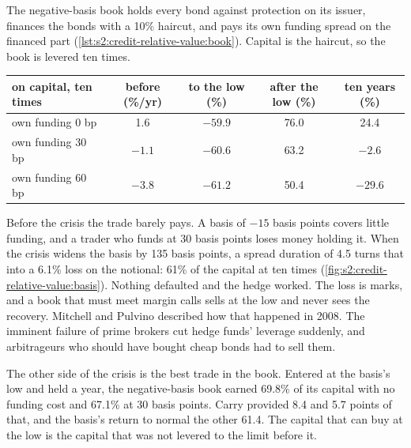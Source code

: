 The negative-basis book holds every bond against protection on its issuer, finances the bonds with a 10\% haircut, and pays its own funding spread on
the financed part (\cref{lst:s2:credit-relative-value:book}). Capital is the haircut, so the book is levered ten times.

\begin{center}
\small
\begin{tabular}{@{}lcccc@{}}
\toprule
on capital, ten times & before (\%/yr) & to the low (\%) & after the low (\%) & ten years (\%)\\
\midrule
own funding 0 bp & 1.6 & $-59.9$ & 76.0 & 24.4\\
own funding 30 bp & $-1.1$ & $-60.6$ & 63.2 & $-2.6$\\
own funding 60 bp & $-3.8$ & $-61.2$ & 50.4 & $-29.6$\\
\bottomrule
\end{tabular}
\end{center}

Before the crisis the trade barely pays. A basis of $-15$ basis points covers little funding, and a trader who funds at 30 basis points loses money
holding it. When the crisis widens the basis by 135 basis points, a spread duration of 4.5 turns that into a 6.1\% loss on the notional: 61\% of the
capital at ten times (\cref{fig:s2:credit-relative-value:basis}). Nothing defaulted and the hedge worked. The loss is marks, and a book that must meet
margin calls sells at the low and never sees the recovery. Mitchell and Pulvino described how that happened in 2008. The imminent failure of prime
brokers cut hedge funds' leverage suddenly, and arbitrageurs who should have bought cheap bonds had to sell them.

The other side of the crisis is the best trade in the book. Entered at the basis's low and held a year, the negative-basis book earned 69.8\% of its
capital with no funding cost and 67.1\% at 30 basis points. Carry provided 8.4 and 5.7 points of that, and the basis's return to normal the other
61.4. The capital that can buy at the low is the capital that was not levered to the limit before it.

